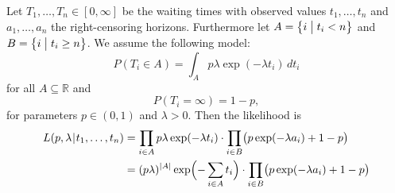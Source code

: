 \documentclass[a4paper]{article}
\def\cond#1#2{(#1\mskip1mu|\mskip1mu #2)}
\def\R{\mathbb{R}}
\begin{document}
Let $T_1, \ldots, T_n \in [0, \infty]$ be the waiting times with observed
values $t_1, \ldots, t_n$ and $a_1,
\ldots, a_n$ the right-censoring horizons.  Furthermore let $A = \bigl\{ i \bigm|
t_i < n \bigr\}$ and $B = \bigl\{ i \bigm| t_i \geq n \bigr\}$.  We assume
the following model:
\begin{equation*}
  P(T_i \in A)
  = \int_A p \lambda \exp(-\lambda t_i) \,dt_i
\end{equation*}
for all $A\subseteq\R$ and
\begin{equation*}
  P(T_i = \infty)
  = 1-p,
\end{equation*}
for parameters $p\in(0,1)$ and $\lambda>0$.
Then the likelihood is
\begin{align*}
  L\cond{p, \lambda}{t_1, \ldots, t_n}
  &= \prod_{i\in A} p \lambda \exp(-\lambda t_i)
     \cdot \prod_{i\in B} \bigl(p \exp(-\lambda a_i) + 1-p \bigr) \\
   &= (p\lambda)^{|A|} \exp\Bigl( -\sum_{i\in A}t_i \Bigr)
     \cdot \prod_{i\in B} \bigl(p \exp(-\lambda a_i) + 1-p \bigr)
\end{align*}
\end{document}

